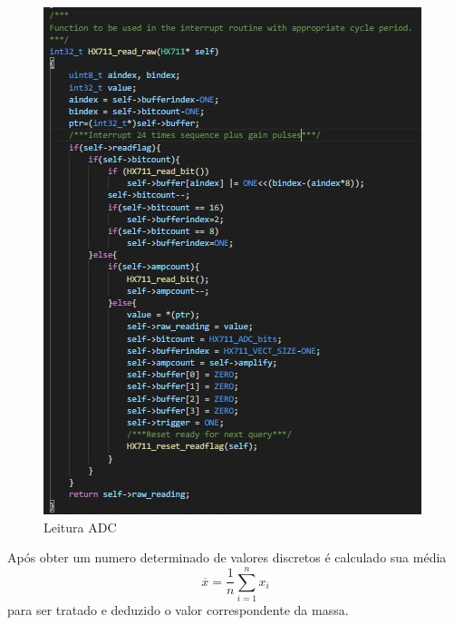 \begin{minipage}[l]{\linewidth}
\begin{minipage}[l]{.33\linewidth}
	\vspace{1.1cm}
	\begin{figure}[H]
		\flushleft
		\captionsetup{justification=raggedright,singlelinecheck=false}
		\includegraphics[scale=0.55]{./image/PESTA/Code/read_raw.jpg}
		\caption{Leitura ADC}
		\label{read_raw}
	\end{figure}
\end{minipage}
\end{minipage}
Após obter um numero determinado de valores discretos é calculado sua média
\begin{equation}
	\label{eq:Mean}
	\overline{x}  =  \frac{1}{n}\sum_{i=1}^n x_i
\end{equation}
para ser tratado e deduzido o valor correspondente da massa.
\newpage
